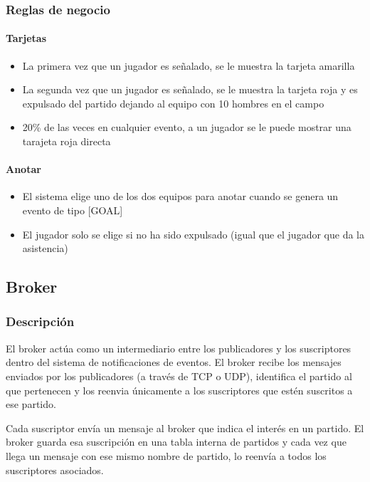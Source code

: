 \documentclass[10pt]{article}
\begin{document}
\subsubsection{Reglas de negocio}

\paragraph{Tarjetas}
\begin{itemize}
\item La primera vez que un jugador es señalado, se le muestra la tarjeta amarilla
\item La segunda vez que un jugador es señalado, se le muestra la tarjeta roja y es expulsado del partido dejando al equipo con 10 hombres en el campo
\item 20\% de las veces en cualquier evento, a un jugador se le puede mostrar una tarajeta roja directa
\end{itemize}

\paragraph{Anotar}
\begin{itemize}
\item El sistema elige uno de los dos equipos para anotar cuando se genera un evento de tipo [GOAL]
\item El jugador solo se elige si no ha sido expulsado (igual que el jugador que da la asistencia)
\end{itemize}

\subsection{Broker}
\subsubsection{Descripción}
El broker actúa como un intermediario entre los publicadores y los suscriptores dentro del sistema de notificaciones de eventos. El broker recibe los mensajes enviados por los publicadores (a través de TCP o UDP), identifica el partido al que pertenecen y los reenvia únicamente a los suscriptores que estén suscritos a ese partido.

Cada suscriptor envía un mensaje al broker que indica el interés en un partido. El broker guarda esa suscripción en una tabla interna de partidos y cada vez que llega un mensaje con ese mismo nombre de partido, lo reenvía a todos los suscriptores asociados.
\end{document}
